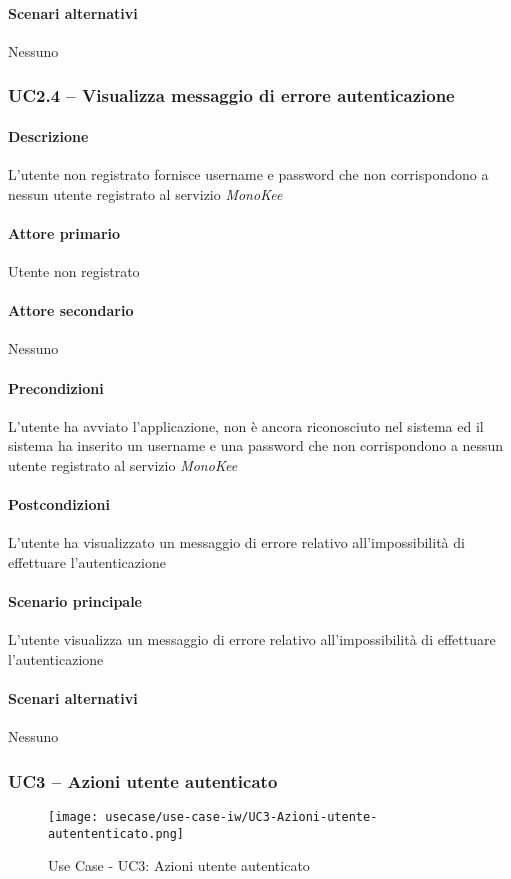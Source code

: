 \paragraph{Scenari alternativi}  Nessuno



\subsubsection{UC2.4 – Visualizza messaggio di errore autenticazione}
\paragraph{Descrizione}  L’utente non registrato fornisce username e password che non corrispondono a nessun utente registrato al servizio \textit{MonoKee}
\paragraph{Attore primario}  Utente non registrato
\paragraph{Attore secondario}  Nessuno
\paragraph{Precondizioni}  L’utente ha avviato l’applicazione, non è ancora riconosciuto nel sistema ed il sistema ha inserito un username e una password che non corrispondono a nessun utente registrato al servizio \textit{MonoKee}
\paragraph{Postcondizioni}  L’utente ha visualizzato un messaggio di errore relativo all’impossibilità di effettuare l’autenticazione
\paragraph{Scenario principale}  
L’utente visualizza un messaggio di errore relativo all’impossibilità di effettuare l’autenticazione
\paragraph{Scenari alternativi}  Nessuno



\subsubsection{UC3 – Azioni utente autenticato}
\begin{figure}[!htbp] 
    \centering 
    \texttt{[image: usecase/use-case-iw/UC3-Azioni-utente-autententicato.png]} 
    \caption{Use Case - UC3: Azioni utente autenticato}
\end{figure}

